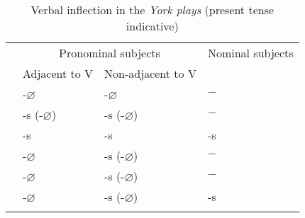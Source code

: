 \documentclass[output=paper]{langsci/langscibook}
\begin{document}
\begin{table}
        \begin{tabular}{llll}
            \lsptoprule
    & \multicolumn{2}{c}{Pronominal subjects} & Nominal subjects\\\cmidrule(lr){2-3}
    & Adjacent to V & Non-adjacent to V & \\
    \midrule
            \Fsg{} & -$\varnothing$ & -$\varnothing$ & $-$\\
            \Ssg{} & -s (-$\varnothing$) & -s (-$\varnothing$) & $-$\\
            \Tsg{} & -s & -s & -s \\
            \Fpl{} & -$\varnothing$ & -s (-$\varnothing$)  & $-$\\
            \Spl{} & -$\varnothing$ & -s (-$\varnothing$) & $-$\\
            \Tpl{} & -$\varnothing$ & -s (-$\varnothing$) & -s \\
            \lspbottomrule
        \end{tabular}
        \caption{Verbal inflection in the \emph{York plays} (present tense
        indicative)\label{tab:trips:10.4}}
\end{table}
\end{document}
